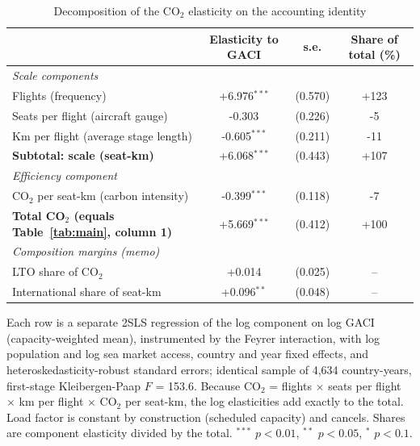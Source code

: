 \documentclass[12pt]{article}
\begin{document}
\begin{table}[htbp]
\centering
\begin{threeparttable}
\caption{Decomposition of the CO$_2$ elasticity on the accounting identity}
\label{tab:decomp}
\footnotesize
\begin{tabular}{lccc}
\toprule
 & Elasticity to GACI & s.e. & Share of total (\%) \\
\midrule
\multicolumn{4}{l}{\textit{Scale components}} \\
  Flights (frequency) & +6.976$^{***}$ & (0.570) & +123 \\
  Seats per flight (aircraft gauge) & -0.303 & (0.226) & -5 \\
  Km per flight (average stage length) & -0.605$^{***}$ & (0.211) & -11 \\
  \textbf{Subtotal: scale (seat-km)} & +6.068$^{***}$ & (0.443) & +107 \\
\multicolumn{4}{l}{\textit{Efficiency component}} \\
  CO$_2$ per seat-km (carbon intensity) & -0.399$^{***}$ & (0.118) & -7 \\
\midrule
  \textbf{Total CO$_2$ (equals Table~\ref{tab:main}, column 1)} & +5.669$^{***}$ & (0.412) & +100 \\
\midrule
\multicolumn{4}{l}{\textit{Composition margins (memo)}} \\
  LTO share of CO$_2$ & +0.014 & (0.025) & -- \\
  International share of seat-km & +0.096$^{**}$ & (0.048) & -- \\
\bottomrule
\end{tabular}
\begin{tablenotes}\footnotesize
\item Each row is a separate 2SLS regression of the log component on log GACI (capacity-weighted mean), instrumented by the Feyrer interaction, with log population and log sea market access, country and year fixed effects, and heteroskedasticity-robust standard errors; identical sample of 4,634 country-years, first-stage Kleibergen-Paap $F$ = 153.6. Because CO$_2$ = flights $\times$ seats per flight $\times$ km per flight $\times$ CO$_2$ per seat-km, the log elasticities add exactly to the total. Load factor is constant by construction (scheduled capacity) and cancels. Shares are component elasticity divided by the total. $^{***}$ $p<0.01$, $^{**}$ $p<0.05$, $^{*}$ $p<0.1$.
\end{tablenotes}
\end{threeparttable}
\end{table}
\end{document}
